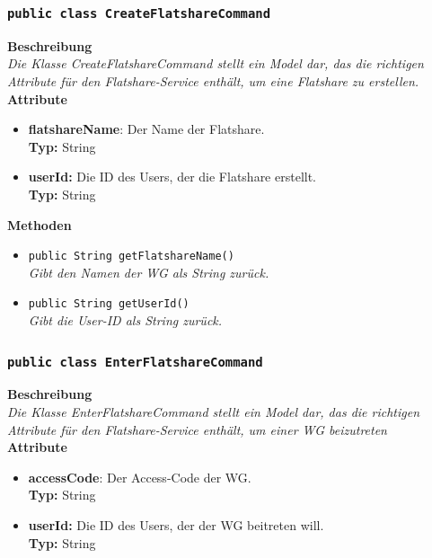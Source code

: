 \documentclass[a4paper]{scrreprt}
\begin{document}
	\subsubsection{\texttt{public class CreateFlatshareCommand}}
	\textbf{Beschreibung} \\
	\textit{Die Klasse CreateFlatshareCommand stellt ein Model dar, das die richtigen Attribute für den Flatshare-Service enthält, um eine Flatshare zu erstellen.} \\
	
	\textbf{Attribute}
	\begin{itemize}
		\item \textbf{flatshareName}: Der Name der Flatshare. \\
		\textbf{Typ:} String
		
		\item \textbf{userId:} Die ID des Users, der die Flatshare erstellt. \\
		\textbf{Typ:} String
	\end{itemize}
	
	\textbf{Methoden}
	\begin{itemize}
		\item{\texttt{public String getFlatshareName()}}\\
		\textit{Gibt den Namen der WG als String zurück.}\\
		\item{\texttt{public String getUserId()}}\\
		\textit{Gibt die User-ID als String zurück.}\\
	\end{itemize}
	\subsubsection{\texttt{public class EnterFlatshareCommand}}
	\textbf{Beschreibung} \\
	\textit{Die Klasse EnterFlatshareCommand stellt ein Model dar, das die richtigen Attribute für den Flatshare-Service enthält, um einer WG beizutreten} \\
	
	\textbf{Attribute}
	\begin{itemize}
		\item \textbf{accessCode}: Der Access-Code der WG. \\
		\textbf{Typ:} String
		
		\item \textbf{userId:} Die ID des Users, der der WG beitreten will. \\
		\textbf{Typ:} String
	\end{itemize}
	
\end{document}
